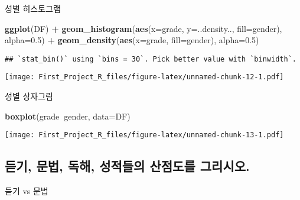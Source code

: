 \documentclass[
]{article}
\newenvironment{Shaded}{\begin{snugshade}}{\end{snugshade}}
\newcommand{\DataTypeTok}[1]{\textcolor[rgb]{0.13,0.29,0.53}{#1}}
\newcommand{\FloatTok}[1]{\textcolor[rgb]{0.00,0.00,0.81}{#1}}
\newcommand{\KeywordTok}[1]{\textcolor[rgb]{0.13,0.29,0.53}{\textbf{#1}}}
\newcommand{\NormalTok}[1]{#1}
\newcommand{\OperatorTok}[1]{\textcolor[rgb]{0.81,0.36,0.00}{\textbf{#1}}}
\newcommand{\StringTok}[1]{\textcolor[rgb]{0.31,0.60,0.02}{#1}}
\begin{document}
성별 히스토그램

\begin{Shaded}
\begin{Highlighting}[]
\KeywordTok{ggplot}\NormalTok{(DF) }\OperatorTok{+}
\StringTok{  }\KeywordTok{geom_histogram}\NormalTok{(}\KeywordTok{aes}\NormalTok{(}\DataTypeTok{x=}\NormalTok{grade, }\DataTypeTok{y=}\NormalTok{..density.., }\DataTypeTok{fill=}\NormalTok{gender), }\DataTypeTok{alpha=}\FloatTok{0.5}\NormalTok{) }\OperatorTok{+}
\StringTok{  }\KeywordTok{geom_density}\NormalTok{(}\KeywordTok{aes}\NormalTok{(}\DataTypeTok{x=}\NormalTok{grade, }\DataTypeTok{fill=}\NormalTok{gender), }\DataTypeTok{alpha=}\FloatTok{0.5}\NormalTok{)}
\end{Highlighting}
\end{Shaded}

\begin{verbatim}
## `stat_bin()` using `bins = 30`. Pick better value with `binwidth`.
\end{verbatim}

\texttt{[image: First\_Project\_R\_files/figure-latex/unnamed-chunk-12-1.pdf]}

성별 상자그림

\begin{Shaded}
\begin{Highlighting}[]
\KeywordTok{boxplot}\NormalTok{(grade}\OperatorTok{~}\NormalTok{gender, }\DataTypeTok{data=}\NormalTok{DF)}
\end{Highlighting}
\end{Shaded}

\texttt{[image: First\_Project\_R\_files/figure-latex/unnamed-chunk-13-1.pdf]}

\hypertarget{uxb4e3uxae30-uxbb38uxbc95-uxb3c5uxd574-uxc131uxc801uxb4e4uxc758-uxc0b0uxc810uxb3c4uxb97c-uxadf8uxb9acuxc2dcuxc624.}{%
\subsection{듣기, 문법, 독해, 성적들의 산점도를
그리시오.}\label{uxb4e3uxae30-uxbb38uxbc95-uxb3c5uxd574-uxc131uxc801uxb4e4uxc758-uxc0b0uxc810uxb3c4uxb97c-uxadf8uxb9acuxc2dcuxc624.}}

듣기 vs 문법

\begin{Shaded}
\end{Shaded}
\end{document}
